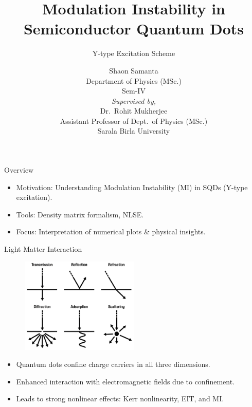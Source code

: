 \documentclass[12pt,aspectratio=1610]{beamer}
\title{Modulation Instability in Semiconductor Quantum Dots}
\subtitle{Y-type Excitation Scheme}
\author{Shaon Samanta\\
        Department of Physics (MSc.)\\
        Sem-IV\\[1.2em]
        \textit{Supervised by,}\\
        Dr.\ Rohit Mukherjee\\
        Assistant Professor of Dept.\ of Physics (MSc.)\\
        Sarala Birla University}
\date{}
\begin{document}
\frame{\titlepage}

\begin{frame}{Overview}
  \vspace{-3pt}
  \begin{itemize}
    \item Motivation: Understanding Modulation Instability (MI) in SQDs (Y-type excitation).
    \item Tools: Density matrix formalism, NLSE\@.
    \item Focus: Interpretation of numerical plots \& physical insights.
  \end{itemize}
\end{frame}

\begin{frame}{Light Matter Interaction}
  \vspace{-20pt}
  \hspace*{55pt}
  \begin{figure}
    \includegraphics[width=0.5\textwidth]{Assets/Light Matter Interaction.jpeg}
  \end{figure}
  \begin{itemize}
    \item Quantum dots confine charge carriers in all three dimensions.
    \item Enhanced interaction with electromagnetic fields due to confinement.
    \item Leads to strong nonlinear effects: Kerr nonlinearity, EIT, and MI\@.
  \end{itemize}
\end{frame}
\end{document}
